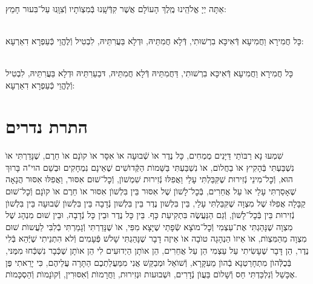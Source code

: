 \documentclass[twoside, openany, parskip=half, 11pt]{book}
\begin{document}
\\
אַתָּה יְיָ אֱלֹהֵֽינוּ מֶֽלֶךְ הָעוֹלָם אֲשֶׁר קִדְּֿשָֽׁנוּ בְּֿמִצְוֹתָיו וְֿצִוָּֽנוּ עַל־בִּעוּר חָמֵץ:


\\
כָּל חֲמִירָא וַחֲמִיעָא דְּֿאִיכָּא בִרְשׁוּתִי, דְּֿלָא חֲמִתֵּיהּ, וּדְלָא בַּעֲרִתֵּיהּ, לִבְטִיל וְֿלֶהֱוֵי כְּֿעַפְרָא דִאַרְעָא:


\\
כָּל חֲמִירָא וַחֲמִיעָא דְּֿאִיכָּא בִרְשׁוּתִי, דַּחֲמִתֵּיהּ דְּֿלָא חֲמִתֵּיהּ, דּבַעַרִתֵּיהּ וּדְלָא בַּעֲרִתֵּיהּ, לִבְטִיל וְֿלֶהֱוֵי כְּֿעַפְרָא דִאַרְעָא:



\chapter[התרת נדרים]{ התרת נדרים }


שִׁמְעוּ נָא רַבּוׂתַי דַּיָּנִים מֻמְחִים, כָּל נֶדֶר אוׂ שְֿׁבוּעָה אוׂ אִסָּר אוׂ קוׂנָם אוׂ חֵרֶם, שֶׁנָּדַרְתִּי אוׂ נִשְׁבַּעְתִּי בְּֿהָקִיץ אוׂ בַחֲלוׂם, אוׂ נִשְׁבַּעְתִּי בַּשֵּׁמוׂת הַקְּֿדוׂשִׁים שֶׁאֵינָם נִמְחָקִים וּבְשֵׁם הוי"ה בָּרוּךְ הוּא, וְֿכׇל־מִינֵי נְֿזִירוּת שֶׁקִּבַּלְתִּי עָלַי וַאֲפִלּוּ נְֿזִירוּת שִׁמְשׁוׂן, וְֿכׇל־שׁוּם אִסּוּר, וַאֲפִלּוּ אִסּוּר הֲנָאָה שֶׁאָסַרְתִּי עָלַי אוׂ עַל אֲחֵרִים, בְּֿכׇל־לָשׁוׂן שֶׁל אִסּוּר בֵּין בִּלְשׁוׂן אִסּוּר אוׂ חֵרֶם אוׂ קוׂנָם וְֿכׇל־שׁוּם קַבָּלָה אֲפִלּוּ שֶׁל מִצְוָה שֶׁקִּבַּלְתִּי עָלַי, בֵּין בִּלְשׁון נֶדֶר בֵּין בִּלְשׁון נְֿדָבָה בֵּין בִּלְשׁוׂן שְֿׁבוּעָה בֵּין בִּלְשׁוׂן נְֿזִירוּת בֵּין בְּֿכׇל־לָשׁוׂן, וְֿגַם הַנַּעֲשֶׂה בִּתְקִיעַת כָּף. בֵּין כָּל נֶדֶר וּבֵין כָּל נְֿדָבָה, וּבֵין שׁוּם מִנְהָג שֶׁל מִצְוָה שֶׁנָּהַגְתִּי אֶת־עַצְמִי וְֿכׇל־מוׂצָא שְֿׂפָתַי שֶׁיָּצָא מִפִּי, אוׂ שֶׁנָּדַרְתִּי וְֿגָמַרְתִּי בְֿלִבִּי לַעֲשוׂת שׁוּם מִצְוָה מֵהַמִּצְוׂת, אוׂ אֵיזוׂ הַנְהָגָה טוׂבָה אוׂ אֵיזֶה דָבָר שֶׁנָּהַגְתִּי שָׁלשׁ פְּֿעָמִים וְֿלא הִתְנֵיתִי שֶׁיְּֿהֵא בְּֿלִי נֶדֶר, הֵן דָּבָר שֶׁעָשִׂיתִי עַל עַצְמִי הֵן עַל אֲחֵרִים, הֵן אוׂתָן הַיְדוּעִים לִי הֵן אוׂתָן שֶׁכְּֿבָר נִשְׁכְּֿחוּ מִמֶּנּי, בְּֿכֻלְּֿהוׂן מִתְחָרַטְנָא בְֿהוׂן מֵעִקָּרָא, וְֿשׁוׂאֵל וּמְבַקֵּשׁ אֲנִי מִמַּעֲלַתְכֶם הַתָּרָה עֲלֵיהֶם, כִּי יָרֵאתִי פֶּן אֶכָּשֵׁל וְֿנִלְכַּדְתִּי חַס וְֿשָׁלוׂם בַּעֲוׂן נְֿדָרִים, וּשְׁבוּעות וּנְזִירוּת, וַחֲרָמוׂת וְֿאִסּוּרִין, וְֿקוׂנָמוׂת וְֿהַסְכָּמוׂת.
\end{document}
